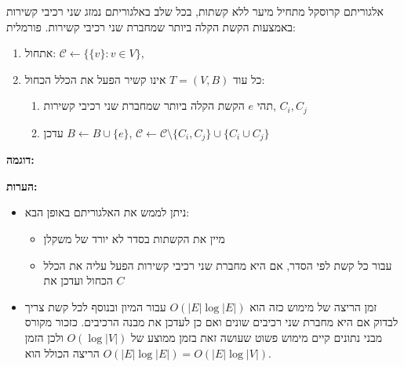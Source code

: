 אלגוריתם קרוסקל מתחיל מיער ללא קשתות, בכל שלב באלגוריתם נמזג שני רכיבי קשירות באמצעות
הקשת הקלה ביותר שמחברת שני רכיבי קשירות.
פורמלית:
\begin{enumerate}
\item
אתחול:
$\mathcal{C} \leftarrow \{\{v\} : v \in V \}$, 
\item
כל עוד 
$T = (V, B)$
אינו קשיר הפעל את הכלל הכחול:
\begin{enumerate}
\item
תהי $e$ הקשת הקלה ביותר שמחברת שני רכיבי קשירות,
$C_i, C_j$
\item
עדכן
$B \leftarrow B \cup \{e\}$,
$\mathcal{C} \leftarrow \mathcal{C} \setminus \{C_i, C_j\} \cup \{C_i \cup C_j\}$

\end{enumerate}
\end{enumerate}

\textbf{דוגמה:}

\begin{center}
\end{center}



\textbf{הערות:}
\begin{itemize}
\item
ניתן לממש את האלגוריתם באופן הבא:
\begin{itemize}
\item
מיין את הקשתות בסדר לא יורד של משקלן
\item
עבור כל קשת לפי הסדר, אם היא מחברת שני רכיבי קשירות הפעל עליה את הכלל הכחול ועדכן את $C$
\end{itemize}
\item
זמן הריצה של מימוש כזה הוא 
$O(|E| \log |E|)$
עבור המיון ובנוסף לכל קשת צריך לבדוק אם היא מחברת שני רכיבים שונים ואם כן לעדכן את מבנה הרכיבים.
כזכור מקורס מבני נתונים קיים מימוש פשוט שעושה זאת בזמן ממוצע של 
$O(\log |V|)$
ולכן הזמן הריצה הכולל הוא 
$O(|E| \log |E|) = O(|E| \log |V|)$.

\end{itemize}
